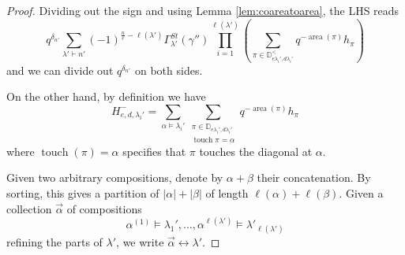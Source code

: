 \documentclass[10pt,a4paper]{amsart}
\newcommand{\Dyck}{\mathbb{D}}
\DeclareMathOperator{\area}{\mathrm{area}}
\DeclareMathOperator{\touch}{touch}
\begin{document}
\begin{proof}
Dividing out the sign and using Lemma \ref{lem:coareatoarea}, the LHS reads $$q^{\delta_{n'}}\sum_{\lambda'\vdash n'} (-1)^{\frac{n}{e}-\ell(\lambda')}\Gamma^{St}_{\lambda'}(\gamma'')\prod_{i=1}^{\ell(\lambda')}\left(\sum_{\pi\in\Dyck_{e\lambda_i',d\lambda_i'}^<}q^{-\area(\pi)}h_\pi\right)$$
and we can divide out $q^{\delta_{n'}}$ on both sides. 

On the other hand, by definition we have 
$$H^-_{e,d,\lambda_i'}=\sum_{\alpha\vDash \lambda_i'}\sum_{\substack{\pi \in \Dyck_{e\lambda_i',d\lambda_i'}\\ \touch{\pi}=\alpha}} q^{-\area(\pi)}h_\pi$$
where $\touch(\pi)=\alpha$ specifies that $\pi$ touches the diagonal at $\alpha$.

Given two arbitrary compositions, denote by $\alpha+\beta$ their concatenation. By sorting, this gives a partition of $|\alpha|+|\beta|$ of length $\ell(\alpha)+\ell(\beta)$. Given a collection $\vec{\alpha}$ of compositions $$\alpha^{(1)}\vDash \lambda_1',\ldots,\alpha^{\ell(\lambda')}\vDash \lambda'_{\ell(\lambda')}$$ refining the parts of $\lambda'$,  we write $\vec{\alpha}\leftrightarrow \lambda'$.  


\end{proof}
\end{document}
